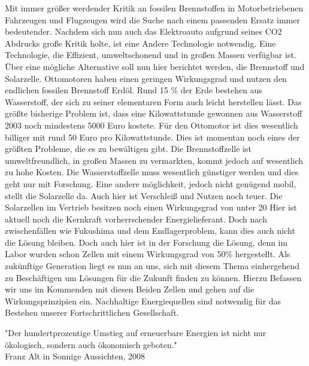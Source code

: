 Mit immer größer werdender Kritik an fossilen Brennstoffen in Motorbetriebenen Fahrzeugen und Flugzeugen wird die Suche nach einem passenden Ersatz immer bedeutender. Nachdem sich nun auch das Elektroauto aufgrund seines CO2 Abdrucks große Kritik holte, ist eine Andere Technologie notwendig. Eine Technologie, die Effizient, umweltschonend und in großen Massen verfügbar ist.
Über eine mögliche Alternative soll nun hier berichtet werden, die Brennstoff und Solarzelle.
Ottomotoren haben einen geringen Wirkungsgrad und nutzen den endlichen fossilen Brennstoff Erdöl.
Rund 15 \% der Erde bestehen aus Wasserstoff, der sich zu seiner elementaren Form auch leicht herstellen lässt.
Das größte bisherige Problem ist, dass eine Kilowattstunde gewonnen aus Wasserstoff 2003 noch mindestens 5000 Euro kostete.
Für den Ottomotor ist dies wesentlich billiger mit rund 50 Euro pro Kilowattstunde.
Dies ist momentan noch eines der größten Probleme, die es zu bewältigen gibt.
Die Brennstoffzelle ist umweltfreundlich, in großen Massen zu vermarkten, kommt jedoch auf wesentlich zu hohe Kosten.
Die Wasserstoffzelle muss wesentlich günstiger werden und dies geht nur mit Forschung.
Eine andere möglichkeit, jedoch nicht genügend mobil, stellt die Solarzelle da.
Auch hier ist Verschleiß und Nutzen noch teuer.
Die Solarzellen im Vertrieb besitzen noch einen Wirkungsgrad von unter 20%
Hier ist aktuell noch die Kernkraft vorherrschender Energielieferant. Doch nach zwischenfällen wie Fukushima und dem Endlagerproblem, kann dies auch nicht die Lösung bleiben.
Doch auch hier ist in der Forschung die Lösung, denn im Labor wurden schon Zellen mit einem Wirkungsgrad von 50\% hergestellt.
Als zukünftige Generation liegt es nun an uns, sich mit diesem Thema einhergehend zu Beschäftigen um Lösungen für die Zukunft finden zu können.
Hierzu Befassen wir uns im Kommenden mit diesen Beiden Zellen und gehen auf die Wirkungsprinzipien ein.
Nachhaltige Energiequellen sind notwendig für das Bestehen unserer Fortschrittlichen Gesellschaft.
\begin{center}
"Der hundertprozentige Umstieg auf erneuerbare Energien ist nicht nur ökologisch, sondern auch ökonomisch geboten."\\
Franz Alt in Sonnige Aussichten, 2008 
\end{center}

